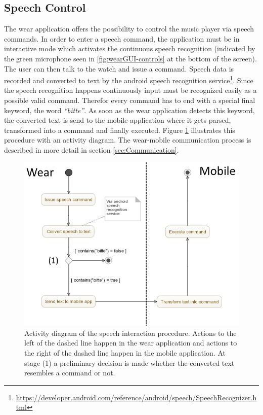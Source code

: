\subsection{Speech Control}
The wear application offers the possibility to control the music player via speech commands. In order to enter a speech command, the application must be in interactive mode which activates the continuous speech recognition (indicated by the green microphone seen in \ref{fig:wearGUI-controls} at the bottom of the screen). The user can then talk to the watch and issue a command. Speech data is recorded and converted to text by the android speech recognition service\footnote{\url{https://developer.android.com/reference/android/speech/SpeechRecognizer.html}}. Since the speech recognition happens continuously input must be recognized easily as a possible valid command. Therefor every command has to end with a special final keyword, the word \textit{``bitte''}. As soon as the wear application detects this keyword, the converted text is send to the mobile application where it gets parsed, transformed into a command and finally executed. Figure \ref{fig:speechActivityDiagram} illustrates this procedure with an activity diagram. The wear-mobile communication process is described in more detail in section \ref{sec:Communication}.
\begin{figure}[bth]
	\myfloatalign
	\includegraphics[width=.99\linewidth]{img/SpeechActivityDiagram.png}
	\caption{Activity diagram of the speech interaction procedure. Actions to the left of the dashed line happen in the wear application and actions to the right of the dashed line happen in the mobile application. At stage (1) a preliminary decision is made whether the converted text resembles a command or not.}
	\label{fig:speechActivityDiagram}
\end{figure}


